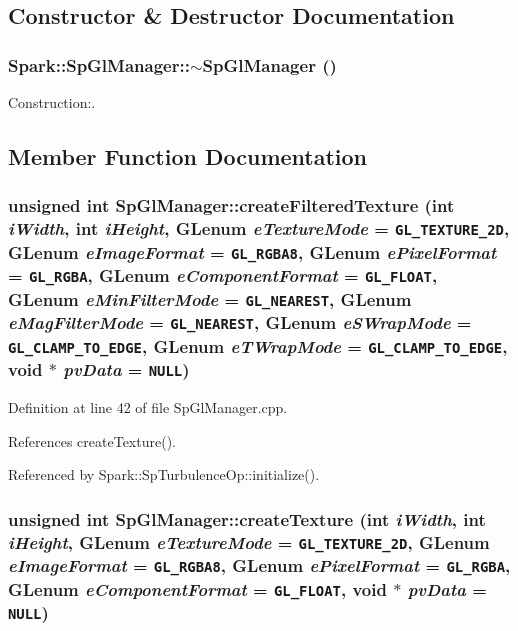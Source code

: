 \subsection{Constructor \& Destructor Documentation}
\subsubsection{\setlength{\rightskip}{0pt plus 5cm}Spark::Sp\-Gl\-Manager::$\sim${\bf Sp\-Gl\-Manager} ()}\label{classSpark_1_1SpGlManager_a0}


Construction:. 



\subsection{Member Function Documentation}
\subsubsection{\setlength{\rightskip}{0pt plus 5cm}unsigned int Sp\-Gl\-Manager::create\-Filtered\-Texture (int {\em i\-Width}, int {\em i\-Height}, GLenum {\em e\-Texture\-Mode} = {\tt GL\_\-TEXTURE\_\-2D}, GLenum {\em e\-Image\-Format} = {\tt GL\_\-RGBA8}, GLenum {\em e\-Pixel\-Format} = {\tt GL\_\-RGBA}, GLenum {\em e\-Component\-Format} = {\tt GL\_\-FLOAT}, GLenum {\em e\-Min\-Filter\-Mode} = {\tt GL\_\-NEAREST}, GLenum {\em e\-Mag\-Filter\-Mode} = {\tt GL\_\-NEAREST}, GLenum {\em e\-SWrap\-Mode} = {\tt GL\_\-CLAMP\_\-TO\_\-EDGE}, GLenum {\em e\-TWrap\-Mode} = {\tt GL\_\-CLAMP\_\-TO\_\-EDGE}, void $\ast$ {\em pv\-Data} = {\tt NULL})\hspace{0.3cm}{\tt  [static]}}\label{classSpark_1_1SpGlManager_e2}


Definition at line 42 of file Sp\-Gl\-Manager.cpp.

References create\-Texture().

Referenced by Spark::Sp\-Turbulence\-Op::initialize().
\subsubsection{\setlength{\rightskip}{0pt plus 5cm}unsigned int Sp\-Gl\-Manager::create\-Texture (int {\em i\-Width}, int {\em i\-Height}, GLenum {\em e\-Texture\-Mode} = {\tt GL\_\-TEXTURE\_\-2D}, GLenum {\em e\-Image\-Format} = {\tt GL\_\-RGBA8}, GLenum {\em e\-Pixel\-Format} = {\tt GL\_\-RGBA}, GLenum {\em e\-Component\-Format} = {\tt GL\_\-FLOAT}, void $\ast$ {\em pv\-Data} = {\tt NULL})\hspace{0.3cm}{\tt  [static]}}\label{classSpark_1_1SpGlManager_e1}


